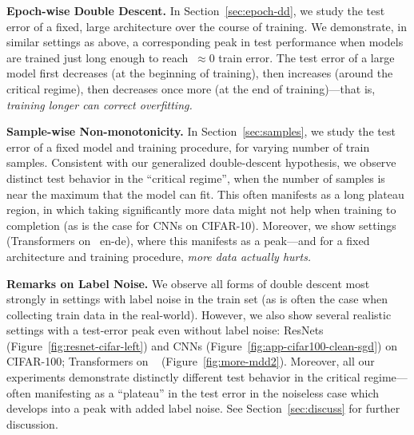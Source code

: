 {\bf Epoch-wise Double Descent.}
In Section~\ref{sec:epoch-dd},
we study the test error of a fixed, large architecture over the course of training.
We demonstrate, in similar settings as above,
a corresponding peak in test performance when
models are trained just long enough to reach $~\approx 0$ train error.
The test error of a large model
first decreases (at the beginning of training), then increases (around the critical regime),
then decreases once more (at the end of training)---that is,
\emph{training longer can correct overfitting.}


{\bf Sample-wise Non-monotonicity.}
In Section~\ref{sec:samples},
we study the test error of a fixed model and training procedure, for varying number of train samples.
Consistent with our generalized double-descent hypothesis,
we observe distinct test behavior in the ``critical regime'',
when the number of samples is near the maximum that the model can fit.
This often manifests as a long plateau region,
in which taking significantly more data might not help when training to completion
(as is the case for CNNs on CIFAR-10).
Moreover, we show settings (Transformers on \iwslt~en-de),
where this manifests as a peak---and for a fixed architecture and training procedure, \emph{more data actually hurts.}

{\bf Remarks on Label Noise.} 
We observe all forms of double descent most strongly in settings
with label noise in the train set
(as is often the case when collecting train data in the real-world).
However, we also show several realistic settings with a test-error peak even without label noise:
ResNets (Figure~\ref{fig:resnet-cifar-left}) and CNNs (Figure~\ref{fig:app-cifar100-clean-sgd}) on CIFAR-100;
Transformers on \iwslt~ (Figure~\ref{fig:more-mdd2}).
Moreover,  all our experiments demonstrate distinctly different test behavior
in the critical regime--- often manifesting as a ``plateau'' in the test error in the noiseless case which 
develops into a peak with added label noise.
See Section~\ref{sec:discuss} for further discussion.

